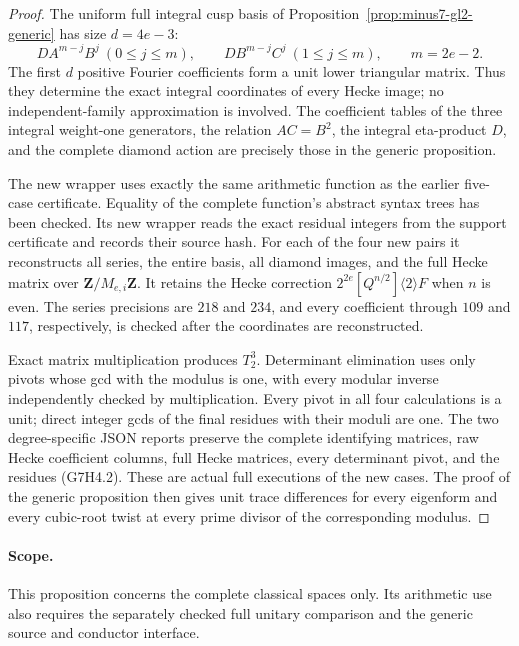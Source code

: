 \documentclass[11pt,a4paper]{article}
\theoremstyle{definition}
\begin{document}
\begin{proof}
The uniform full integral cusp basis of
Proposition~\ref{prop:minus7-gl2-generic} has size \(d=4e-3\):
\[
 DA^{m-j}B^j\ (0\le j\le m),\qquad
 DB^{m-j}C^j\ (1\le j\le m),\qquad m=2e-2.
\]
The first \(d\) positive Fourier coefficients form a unit lower
triangular matrix. Thus they determine the exact integral coordinates
of every Hecke image; no independent-family approximation is involved.
The coefficient tables of the three integral weight-one generators,
the relation \(AC=B^2\), the integral eta-product \(D\), and the
complete diamond action are precisely those in the generic proposition.

The new wrapper
uses exactly the same arithmetic function as the earlier five-case
certificate. Equality of the complete function's abstract syntax trees
has been checked. Its new wrapper reads the exact residual integers
from the support certificate and records their source hash.
For each of the four new pairs it reconstructs all series, the entire
basis, all diamond images, and the full Hecke matrix over
\(\mathbf Z/M_{e,i}\mathbf Z\). It retains the Hecke correction
\(2^{2e}[Q^{n/2}]\langle2\rangle F\) when \(n\) is even.
The series precisions are \(218\) and \(234\), and every coefficient
through \(109\) and \(117\), respectively, is checked after the
coordinates are reconstructed.

Exact matrix multiplication produces \(T_2^3\). Determinant
elimination uses only pivots whose gcd with the modulus is one,
with every modular inverse independently checked by multiplication.
Every pivot in all four calculations is a unit; direct integer gcds
of the final residues with their moduli are one. The two degree-specific
JSON reports preserve the complete identifying matrices, raw Hecke
coefficient columns, full Hecke matrices, every determinant pivot,
and the residues (G7H4.2). These are actual full executions of the
new cases. The proof of the generic proposition then gives unit
trace differences for every eigenform and every cubic-root twist
at every prime divisor of the corresponding modulus.
\end{proof}

\paragraph{Scope.}
This proposition concerns the complete classical spaces only.
Its arithmetic use also requires the separately checked full unitary
comparison and the generic source and conductor interface.
\end{document}
